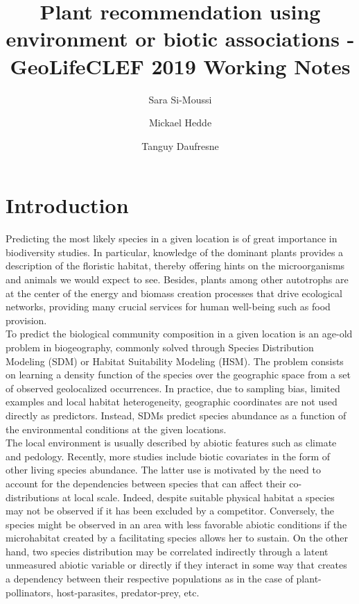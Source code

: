 \documentclass[]{article}
\title{Plant recommendation using environment or biotic associations - GeoLifeCLEF 2019 Working Notes}
\author[1,2,3]{Sara Si-Moussi}
\author[1]{Mickael Hedde}
\author[1]{Tanguy Daufresne}
\affil[1]{Eco\&Sols, UMR 1222 INRA-Montpellier SupAgro, Montpellier}
\affil[2]{Loria, UMR 7503 Inria, Vandœuvre-lès-Nancy}
\affil[3]{LECA, UMR 5553 CNRS-Université Grenoble Alpes, Saint-Martin-d'Hères}
\date{}                     %
\begin{document}
	
	\maketitle

\section{Introduction}
Predicting the most likely species in a given location is of great importance in biodiversity studies. In particular, knowledge of the dominant plants provides a description of the floristic habitat, thereby offering hints on the microorganisms and animals we would expect to see. Besides, plants among other autotrophs are at the center of the energy and biomass creation processes that drive ecological networks, providing many crucial services for human well-being such as food provision.\\ 

\noindent To predict the biological community composition in a given location is an age-old problem in biogeography, commonly solved through Species Distribution Modeling (SDM) or Habitat Suitability Modeling (HSM). The problem consists on learning a density function of the species over the geographic space from a set of observed geolocalized occurrences. In practice, due to sampling bias, limited examples and local habitat heterogeneity, geographic coordinates are not used directly as predictors. Instead, SDMs predict species abundance as a function of the environmental conditions at the given locations.\\

\noindent The local environment is usually described by abiotic features such as climate and pedology. Recently, more studies include biotic covariates in the form of other living species abundance. The latter use is motivated by the need to account for the dependencies between species that can affect their co-distributions at local scale. Indeed, despite suitable physical habitat a species may not be observed if it has been excluded by a competitor. Conversely, the species might be observed in an area with less favorable abiotic conditions if the microhabitat created by a facilitating species allows her to sustain. On the other hand, two species distribution may be correlated indirectly through a latent unmeasured abiotic variable or directly if they interact in some way that creates a dependency between their respective populations as in the case of plant-pollinators, host-parasites, predator-prey, etc.\\
\end{document}
